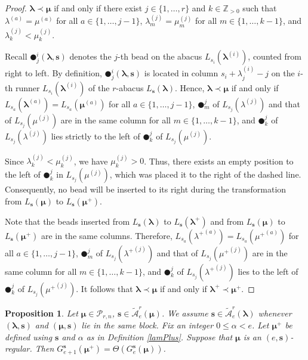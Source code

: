 \documentclass[a4paper,10pt]{amsart}
\theoremstyle{plain}
\def\bs{{\boldsymbol{s}}}
\def\PP{\mathscr{P}}
\def\blam{{\boldsymbol \lambda}}
\def\bmu{{\boldsymbol \mu}}
\theoremstyle{plain}
\newtheorem{proposition}[theorem]{Proposition}
\numberwithin{equation}{section}
\begin{document}
\begin{proof} $\blam \prec \bmu$ if and only if there exist $j\in \{1,\ldots,r\}$ and $k\in \mathbb{Z}_{>0}$ such that $\lambda^{(a)}=\mu^{(a)}$ for all $a\in \{1,\ldots,j-1\}$, $\lambda^{(j)}_m=\mu^{(j)}_m$ for all $m\in \{1,\ldots,k-1\}$, and $\lambda^{(j)}_k<\mu^{(j)}_k$.

Recall $\CIRCLE_j^i(\blam, \bs)$ denotes the $j$-th bead on the abacus $L_{s_i}(\blam^{(i)})$, counted from right to left. By definition, $\CIRCLE_j^i(\blam, \bs)$ is located in column $s_i+\lambda^{(i)}_j-j$ on the $i$-th runner $L_{s_i}(\blam^{(i)})$ of the $r$-abacus $L_\bs(\blam)$. Hence, $\blam \prec \bmu$ if and only if $L_{s_a}(\blam^{(a)})=L_{s_a}(\bmu^{(a)})$ for all $a\in \{1, \ldots, j-1\}$, $\CIRCLE^j_m$ of $L_{s_j}(\lambda^{(j)})$ and that of $L_{s_j}(\mu^{(j)})$ are in the same column for all $m\in \{1, \ldots, k-1\}$, and $\CIRCLE^j_k$ of $L_{s_j}(\lambda^{(j)})$ lies strictly to the left of $\CIRCLE^j_k$ of $L_{s_j}(\mu^{(j)})$.

Since $\lambda^{(j)}_k<\mu^{(j)}_k$, we have $\mu^{(j)}_k>0$. Thus, there exists an empty position to the left of $\CIRCLE^j_k$ in $L_{s_j}(\mu^{(j)})$, which was placed it to the right of the dashed line. Consequently, no bead will be inserted to its right during the transformation from $L_\bs(\bmu)$ to $L_\bs(\bmu^+)$.

Note that the beads inserted from $L_\bs(\blam)$ to $L_\bs(\blam^+)$ and from $L_\bs(\bmu)$ to $L_\bs(\bmu^+)$ are in the same columns. Therefore, $L_{s_a}({\lambda^+}^{(a)})=L_{s_a}({\mu^+}^{(a)})$ for all $a\in \{1, \ldots, j-1\}$, $\CIRCLE^j_m$ of $L_{s_j}({\lambda^+}^{(j)})$ and that of $L_{s_j}({\mu^+}^{(j)})$ are in the same column for all $m\in \{1, \ldots, k-1\}$, and $\CIRCLE^j_k$ of $L_{s_j}({\lambda^+}^{(j)})$ lies to the left of $\CIRCLE^j_k$ of $L_{s_j}({\mu^+}^{(j)})$. It follows that $\blam \prec \bmu$ if and only if $\blam^+ \prec \bmu^+$.
\end{proof}


\begin{proposition}\label{KeyCanonicalBases}
Let $\bmu\in\PP_{r,n}$, $\bs\in \tilde{\mathcal A}^r_e(\bmu)$. We assume $\bs\in \tilde{\mathcal A}^r_e(\blam)$ whenever $(\blam, \bs)$ and $(\bmu, \bs)$ lie in the same block. Fix an integer $0 \le \alpha < e$. Let $\bmu^+$ be defined using $\bs$ and $\alpha$ as in Definition \ref{lamPlus}.
Suppose that $\bmu$ is an $(e,\bs)$-regular. Then $G^{\bs}_{e+1}(\bmu^+)=\varTheta (G^{\bs}_e(\bmu))$.
\end{proposition}
\end{document}
